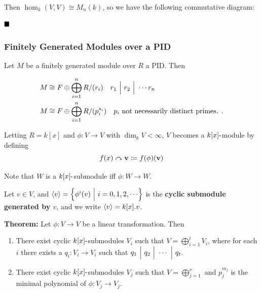 Then \(\hom_k(V, V) \cong M_n(k)\), so we have the following commutative
diagram:

\begin{center}
\end{center}

\(\qed\)

\hypertarget{finitely-generated-modules-over-a-pid}{%
\subsubsection{Finitely Generated Modules over a
PID}\label{finitely-generated-modules-over-a-pid}}

Let \(M\) be a finitely generated module over \(R\) a PID. Then

\begin{align*}
M &\cong F \oplus \bigoplus_{i=1}^n R/(r_i)
\quad r_1 {~\Bigm| ~} r_2 {~\Bigm| ~} \cdots r_n \\
M &\cong F \oplus \bigoplus_{i=1}^n R/(p_i^{s_i})
\quad p_i \text{ not necessarily distinct primes. }
.\end{align*}

Letting \(R = k[x]\) and \(\phi: V\to V\) with \(\dim_k V < \infty\),
\(V\) becomes a \(k[x]{\hbox{-}}\)module by defining \[
f(x) \curvearrowright \mathbf{v} \coloneqq f(\phi)(\mathbf{v})
\]

Note that \(W\) is a \(k[x]{\hbox{-}}\)submodule iff \(\phi: W \to W\).

Let \(v\in V\), and
\(\left\langle{v}\right\rangle = \left\{{\phi^i(v) {~\mathrel{\Big|}~} i = 0,1,2,\cdots}\right\}\) is
the \textbf{cyclic submodule generated by \(v\)}, and we write
\(\left\langle{v}\right\rangle = k[x].v\).

\textbf{Theorem:} Let \(\phi: V\to V\) be a linear transformation. Then

\begin{enumerate}
\def\labelenumi{\arabic{enumi}.}
\item
  There exist cyclic \(k[x]{\hbox{-}}\)submodules \(V_i\) such that
  \(V = \bigoplus_{i=1}^t V_i\), where for each \(i\) there exists a
  \(q_i: V_i \to V_i\) such that
  \(q_1 {~\Bigm| ~} q_2 {~\Bigm| ~} \cdots {~\Bigm| ~} q_t\).
\item
  There exist cyclic \(k[x]{\hbox{-}}\)submodules \(V_j\) such that
  \(V = \bigoplus_{j=1}^\nu\) and \(p_j^{m_j}\) is the minimal
  polynomial of \(\phi: V_j \to V_j\).
\end{enumerate}

